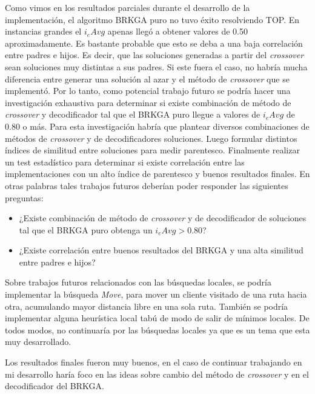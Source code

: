 Como vimos en los resultados parciales durante el desarrollo de la implementación, el algoritmo BRKGA puro no tuvo éxito resolviendo TOP. En instancias grandes el $i_eAvg$ apenas llegó a obtener valores de 0.50 aproximadamente. Es bastante probable que esto se deba a una baja correlación entre padres e hijos. Es decir, que las soluciones generadas a partir del \textit{crossover} sean soluciones muy distintas a sus padres. Si este fuera el caso, no habría mucha diferencia entre generar una solución al azar y el método de \textit{crossover} que se implementó. Por lo tanto, como potencial trabajo futuro se podría hacer una investigación exhaustiva para determinar si existe combinación de método de \textit{crossover} y decodificador tal que el BRKGA puro llegue a valores de $i_eAvg$ de 0.80 o más. Para esta investigación habría que plantear diversos combinaciones de métodos de \textit{crossover} y de decodificadores soluciones. Luego formular distintos índices de similitud entre soluciones para medir parentesco. Finalmente realizar un test estadístico para determinar si existe correlación entre las implementaciones con un alto índice de parentesco y buenos resultados finales. En otras palabras tales trabajos futuros deberían poder responder las siguientes preguntas:

\begin{itemize}
	\item ¿Existe combinación de método de \textit{crossover} y de decodificador de soluciones tal que el BRKGA puro obtenga un  $i_eAvg > 0.80$?
	\item ¿Existe correlación entre buenos resultados del BRKGA y una alta similitud entre padres e hijos?
\end{itemize}

\bigskip

Sobre trabajos futuros relacionados con las búsquedas locales, se podría implementar la búsqueda \textit{Move}, para mover un cliente visitado de una ruta hacia otra, acumulando mayor distancia libre en una sola ruta. También se podría implementar alguna heurística local tabú de modo de salir de mínimos locales. De todos modos, no continuaría por las búsquedas locales ya que es un tema que esta muy desarrollado.

\bigskip

Los resultados finales fueron muy buenos, en el caso de continuar trabajando en mi desarrollo haría foco en las ideas sobre cambio del método de \textit{crossover} y en el decodificador del BRKGA.








